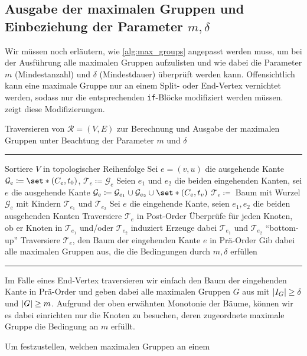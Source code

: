 \subsection{Ausgabe der maximalen Gruppen und Einbeziehung der Parameter $m,\delta$} %
\label{sub:ausgabe_der_maximalen_gruppen_und_einbeziehung_der_parameter_m_delta}
Wir müssen noch erläutern, wie \cref{alg:max_groups} angepasst werden muss, um bei der Ausführung alle maximalen Gruppen aufzulisten und wie dabei die Parameter $m$ (Mindestanzahl) und $\delta$ (Mindestdauer) überprüft werden kann.
Offensichtlich kann eine maximale Gruppe nur an einem Split- oder End-Vertex vernichtet werden, sodass nur die entsprechenden \texttt{if}-Blöcke modifiziert werden müssen.
 zeigt diese Modifizierungen.
\begin{algorithm}[hbt]
	\caption{Traversieren von $\mathcal{R}=(V,E)$ zur Berechnung und Ausgabe der maximalen Gruppen unter Beachtung der Parameter $m$ und $\delta$} \label{alg:max_groups_final}
	\vspace{.5em}
	\hrule\vspace{.5em}
	
	\begin{algorithmic}
		\State Sortiere $V$ in topologischer Reihenfolge
			\State Sei $e=(v,u)$ die ausgehende Kante
			\State $\mathcal{G}_e \coloneqq \set*{(C_e,t_0)}$, $\mathcal{T}_e \coloneqq \mathcal{G}_e$
			\State Seien $e_1$ und $e_2$ die beiden eingehenden Kanten, sei $e$ die ausgehende Kante
			\State $\mathcal{G}_e \coloneqq \mathcal{G}_{e_1} \cup \mathcal{G}_{e_2} \cup \set*{(C_e,t_v)}$
			\State $\mathcal{T}_e \coloneqq$ Baum mit Wurzel $\mathcal{G}_e$ mit Kindern $\mathcal{T}_{e_1}$ und $\mathcal{T}_{e_2}$
			\State Sei $e$ die eingehende Kante, seien $e_1,e_2$ die beiden ausgehenden Kanten
			\State Traversiere $\mathcal{T}_e$ in Post-Order
			\State Überprüfe für jeden Knoten, ob er Knoten in $\mathcal{T}_{e_1}$ und/oder $\mathcal{T}_{e_2}$ induziert
			\State Erzeuge dabei $\mathcal{T}_{e_1}$ und $\mathcal{T}_{e_2}$ \enquote{bottom-up}
			\State Traversiere $\mathcal{T}_e$, den Baum der eingehenden Kante $e$ in Prä-Order
			\State Gib dabei alle maximalen Gruppen aus, die die Bedingungen durch $m,\delta$ erfüllen
			\EndIf
		\EndFor
		\EndProcedure
	\end{algorithmic}
	\hrule
\end{algorithm}

Im Falle eines End-Vertex traversieren wir einfach den Baum der eingehenden Kante in Prä-Order und geben dabei alle maximalen Gruppen $G$ aus mit $\abs{I_G}\ge \delta$ und $\abs*{G}\ge m$.
Aufgrund der oben erwähnten Monotonie der Bäume, können wir es dabei einrichten nur die Knoten zu besuchen, deren zugeordnete maximale Gruppe die Bedingung an $m$ erfüllt.

Um festzustellen, welchen maximalen Gruppen an einem






